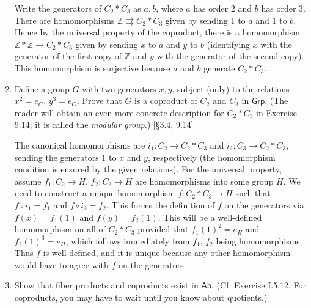 \begin{enumerate}
            \begin{solution}
                  Write the generators of $C_2 \ast C_3$ as $a, b$, where $a$ has order 2 and $b$ has order 3. There are homomorphisms $\mathbb{Z} \rightrightarrows C_2 \ast C_3$ given by sending 1 to $a$ and 1 to $b$. Hence by the universal property of the coproduct, there is a homomorphism $\mathbb{Z} \ast \mathbb{Z} \to C_2 \ast C_3$ given by sending $x$ to $a$ and $y$ to $b$ (identifying $x$ with the generator of the first copy of $\mathbb{Z}$ and $y$ with the generator of the second copy). This homomorphism is surjective because $a$ and $b$ generate $C_2 \ast C_3$.
            \end{solution}

      \item Define a group $G$ with two generators $x, y$, subject (only) to the relations $x^2 = e_G$, $y^3 = e_G$. Prove that $G$ is a coproduct of $C_2$ and $C_3$ in $\mathsf{Grp}$. (The reader will obtain an even more concrete description for $C_2 \ast C_3$ in Exercise 9.14; it is called the \textit{modular group}.) [\S3.4, 9.14]
      
      \begin{solution}
            The canonical homomorphisms are $i_1:C_2 \to C_2 \ast C_3$ and $i_2:C_3 \to C_2 \ast C_3$, sending the generators $1$ to $x$ and $y$, respectively (the homomorphism condition is ensured by the given relations). For the universal property, assume $f_1:C_2 \to H$, $f_2:C_3 \to H$ are homomorphisms into some group $H$. We need to construct a unique homomorphism $f:C_2 \ast C_3 \to H$ such that $f \circ i_1 = f_1$ and $f \circ i_2 = f_2$. This forces the definition of $f$ on the generators via $f(x) = f_1(1)$ and $f(y) = f_2(1)$. This will be a well-defined homomorphism on all of $C_2 \ast C_3$ provided that $f_1(1)^2 = e_H$ and $f_2(1)^3 = e_H$, which follows immediately from $f_1$, $f_2$ being homomorphisms. Thus $f$ is well-defined, and it is unique because any other homomorphism would have to agree with $f$ on the generators.
      \end{solution}

      \item Show that fiber products and coproducts exist in $\mathsf{Ab}$. (Cf. Exercise I.5.12. For coproducts, you may have to wait until you know about quotients.)
\end{enumerate}
